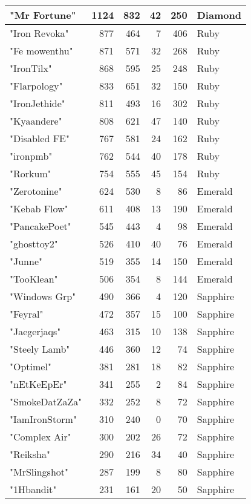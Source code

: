 \documentclass{article}
\begin{document}
\begin{table}[htbp]
\begin{tabular}{|l|r|r|r|r|l|}
"Mr Fortune" & 1124 & 832 & 42 & 250 & Diamond \\ \hline
"Iron Revoka" & 877 & 464 & 7 & 406 & Ruby \\ \hline
"Fe mowenthu" & 871 & 571 & 32 & 268 & Ruby \\ \hline
"IronTilx" & 868 & 595 & 25 & 248 & Ruby \\ \hline
"Flarpology" & 833 & 651 & 32 & 150 & Ruby \\ \hline
"IronJethide" & 811 & 493 & 16 & 302 & Ruby \\ \hline
"Kyaandere" & 808 & 621 & 47 & 140 & Ruby \\ \hline
"Disabled FE" & 767 & 581 & 24 & 162 & Ruby \\ \hline
"ironpmb" & 762 & 544 & 40 & 178 & Ruby \\ \hline
"Rorkum" & 754 & 555 & 45 & 154 & Ruby \\ \hline
"Zerotonine" & 624 & 530 & 8 & 86 & Emerald \\ \hline
"Kebab Flow" & 611 & 408 & 13 & 190 & Emerald \\ \hline
"PancakePoet" & 545 & 443 & 4 & 98 & Emerald \\ \hline
"ghosttoy2" & 526 & 410 & 40 & 76 & Emerald \\ \hline
"Junne" & 519 & 355 & 14 & 150 & Emerald \\ \hline
"TooKlean" & 506 & 354 & 8 & 144 & Emerald \\ \hline
"Windows Grp" & 490 & 366 & 4 & 120 & Sapphire \\ \hline
"Feyral" & 472 & 357 & 15 & 100 & Sapphire \\ \hline
"Jaegerjaqs" & 463 & 315 & 10 & 138 & Sapphire \\ \hline
"Steely Lamb" & 446 & 360 & 12 & 74 & Sapphire \\ \hline
"Optimel" & 381 & 281 & 18 & 82 & Sapphire \\ \hline
"nEtKeEpEr" & 341 & 255 & 2 & 84 & Sapphire \\ \hline
"SmokeDatZaZa" & 332 & 252 & 8 & 72 & Sapphire \\ \hline
"IamIronStorm" & 310 & 240 & 0 & 70 & Sapphire \\ \hline
"Complex Air" & 300 & 202 & 26 & 72 & Sapphire \\ \hline
"Reiksha" & 290 & 216 & 34 & 40 & Sapphire \\ \hline
"MrSlingshot" & 287 & 199 & 8 & 80 & Sapphire \\ \hline
"1Hbandit" & 231 & 161 & 20 & 50 & Sapphire \\ \hline

\end{tabular}
\end{table}
\end{document}
